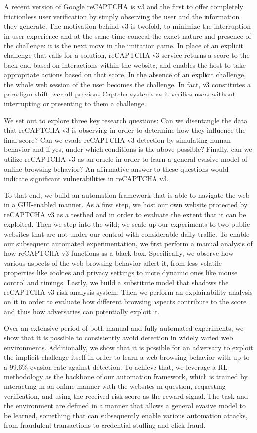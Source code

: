 A recent version of Google reCAPTCHA is v3 and the first to offer completely frictionless user verification by simply observing the user and the information they generate.
The motivation behind v3 is twofold, to minimize the interruption in user experience and at the same time conceal the exact nature and presence of the challenge: it is the next move in the imitation game.
In place of an explicit challenge that calls for a solution, reCAPTCHA v3 service returns a score to the back-end based on interactions within the website, and enables the host to take appropriate actions based on that score.
In the absence of an explicit challenge, the whole web session of the user becomes the challenge.
In fact, v3 constitutes a paradigm shift over all previous Captcha systems as it verifies users without interrupting or presenting to them a challenge.

We set out to explore three key research questions:
Can we disentangle the data that reCAPTCHA v3 is observing in order to determine how they influence the final score?
Can we evade reCAPTCHA v3 detection by simulating human behavior and if yes, under which conditions is the above possible?
Finally, can we utilize reCAPTCHA v3 as an oracle in order to learn a general evasive model of online browsing behavior?
An affirmative answer to these questions would indicate significant vulnerabilities in reCAPTCHA v3.

To that end, we build an automation framework that is able to navigate the web in a GUI-enabled manner.
As a first step, we host our own website protected by reCAPTCHA v3 as a testbed and in order to evaluate the extent that it can be exploited.
Then we step into the wild; we scale up our experiments to two public websites that are not under our control with considerable daily traffic.
To enable our subsequent automated experimentation, we first perform a manual analysis of how reCAPTCHA v3 functions as a black-box.
Specifically, we observe how various aspects of the web browsing behavior affect it, from less volatile properties like cookies and privacy settings to more dynamic ones like mouse control and timings.
Lastly, we build a substitute model that shadows the reCAPTCHA v3 risk analysis system.
Then we perform an explainability analysis on it in order to evaluate how different browsing aspects contribute to the score and thus how adversaries can potentially exploit it.

Over an extensive period of both manual and fully automated experiments, we show that it is possible to consistently avoid detection in widely varied web environments.
Additionally, we show that it is possible for an adversary to exploit the implicit challenge itself in order to learn a web browsing behavior with up to a 99.6\% evasion rate against detection.
To achieve that, we leverage a \gls{RL} methodology as the backbone of our automation framework, which is trained by interacting in an online manner with the websites in question, requesting verification, and using the received risk score as the reward signal.
The task and the environment are defined in a manner that allows a general evasive model to be learned, something that can subsequently enable various automation attacks, from fraudulent transactions to credential stuffing and click fraud.

